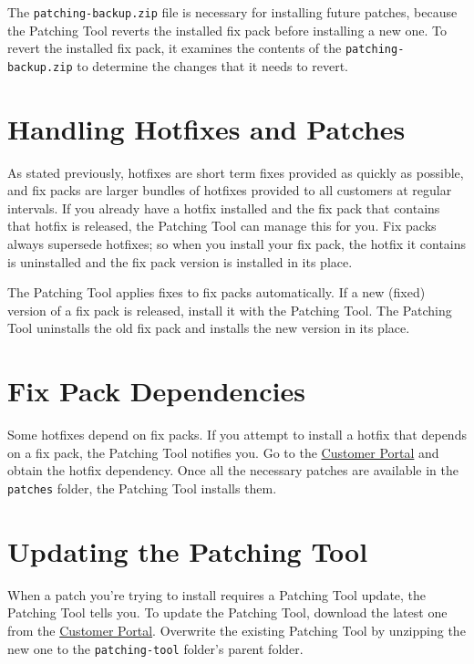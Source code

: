 \noindent\hrulefill

The \texttt{patching-backup.zip} file is necessary for installing future
patches, because the Patching Tool reverts the installed fix pack before
installing a new one. To revert the installed fix pack, it examines the
contents of the \texttt{patching-backup.zip} to determine the changes
that it needs to revert.

\section{Handling Hotfixes and
Patches}\label{handling-hotfixes-and-patches}

As stated previously, hotfixes are short term fixes provided as quickly
as possible, and fix packs are larger bundles of hotfixes provided to
all customers at regular intervals. If you already have a hotfix
installed and the fix pack that contains that hotfix is released, the
Patching Tool can manage this for you. Fix packs always supersede
hotfixes; so when you install your fix pack, the hotfix it contains is
uninstalled and the fix pack version is installed in its place.

The Patching Tool applies fixes to fix packs automatically. If a new
(fixed) version of a fix pack is released, install it with the Patching
Tool. The Patching Tool uninstalls the old fix pack and installs the new
version in its place.

\section{Fix Pack Dependencies}\label{fix-pack-dependencies}

Some hotfixes depend on fix packs. If you attempt to install a hotfix
that depends on a fix pack, the Patching Tool notifies you. Go to the
\href{hhttps://customer.liferay.com/downloads}{Customer Portal} and
obtain the hotfix dependency. Once all the necessary patches are
available in the \texttt{patches} folder, the Patching Tool installs
them.

\section{Updating the Patching Tool}\label{updating-the-patching-tool}

When a patch you're trying to install requires a Patching Tool update,
the Patching Tool tells you. To update the Patching Tool, download the
latest one from the
\href{https://customer.liferay.com/downloads?p_p_id=com_liferay_osb_customer_downloads_display_web_DownloadsDisplayPortlet&_com_liferay_osb_customer_downloads_display_web_DownloadsDisplayPortlet_productAssetCategoryId=118191019&_com_liferay_osb_customer_downloads_display_web_DownloadsDisplayPortlet_fileTypeAssetCategoryId=118191066}{Customer
Portal}. Overwrite the existing Patching Tool by unzipping the new one
to the \texttt{patching-tool} folder's parent folder.

